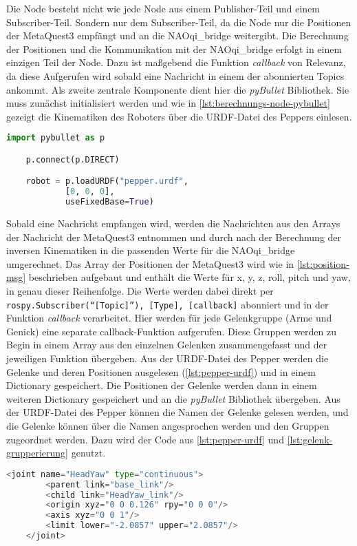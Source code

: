 Die Node besteht nicht wie jede Node aus einem Publisher-Teil und einem Subscriber-Teil. Sondern nur dem Subscriber-Teil, da die Node nur die Positionen der MetaQuest3 empfängt und an die NAOqi\_bridge weitergibt. Die Berechnung der Positionen und die Kommunikation mit der NAOqi\_bridge erfolgt in einem einzigen Teil der Node. Dazu ist maßgebend die Funktion \textit{callback} von Relevanz, da diese Aufgerufen wird sobald eine Nachricht in einem der abonnierten Topics ankommt. Als zweite zentrale Komponente dient hier die \textit{pyBullet} Bibliothek. Sie muss zunächst initialisiert werden und wie in \autoref{lst:berechnungs-node-pybullet} gezeigt die Kinematiken des Roboters über die \ac{URDF}-Datei des Peppers einlesen.\\
\begin{lstlisting}[language=Python, caption=Berechnungs-Node-Initialisierung von PyBullet, label=lst:berechnungs-node-pybullet]
    import pybullet as p

    p.connect(p.DIRECT)

    robot = p.loadURDF("pepper.urdf",
            [0, 0, 0],
            useFixedBase=True)
\end{lstlisting}
Sobald eine Nachricht empfangen wird, werden die Nachrichten aus den Arrays der Nachricht der MetaQuest3 entnommen und durch nach der Berechnung der inversen Kinematiken in die passenden Werte für die NAOqi\_bridge umgerechnet. Das Array der Positionen der MetaQuest3 wird wie in \autoref{lst:position-msg} beschrieben aufgebaut und enthält die Werte für x, y, z, roll, pitch und yaw, in genau dieser Reihenfolge. Die Werte werden dabei direkt per \texttt{rospy.Subscriber(``[Topic]''), [Type], [callback]} abonniert und in der Funktion \textit{callback} verarbeitet. Hier werden für jede Gelenkgruppe (Arme und Genick) eine separate callback-Funktion aufgerufen. Diese Gruppen werden zu Begin in einem Array aus den einzelnen Gelenken zusammengefasst und der jeweiligen Funktion übergeben. Aus der \ac{URDF}-Datei des Pepper werden die Gelenke und deren Positionen ausgelesen (\autoref{lst:pepper-urdf}) und in einem Dictionary gespeichert. Die Positionen der Gelenke werden dann in einem weiteren Dictionary gespeichert und an die \textit{pyBullet} Bibliothek übergeben. Aus der \ac{URDF}-Datei des Pepper können die Namen der Gelenke gelesen werden, und die Gelenke können über die Namen angesprochen werden und den Gruppen zugeordnet werden. Dazu wird der Code aus \autoref{lst:pepper-urdf} und \autoref{lst:gelenk-grupperierung} genutzt.\\
\begin{lstlisting}[language=Python, caption=Ausschnitt der URDF-Datei des Pepper, label=lst:pepper-urdf]
    <joint name="HeadYaw" type="continuous">
        <parent link="base_link"/>
        <child link="HeadYaw_link"/>
        <origin xyz="0 0 0.126" rpy="0 0 0"/>
        <axis xyz="0 0 1"/>
        <limit lower="-2.0857" upper="2.0857"/>
    </joint>
\end{lstlisting}

